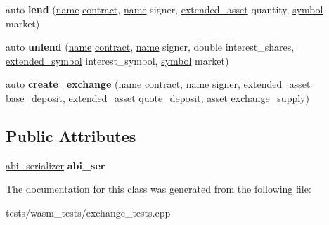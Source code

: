 \begin{DoxyCompactItemize}
\item 
\mbox{\label{classexchange__tester_ab7478daacc99eec074c56476e4bf1ba6}} 
auto {\bfseries lend} (\mbox{\hyperlink{structaacio_1_1name}{name}} \mbox{\hyperlink{structaacio_1_1contract}{contract}}, \mbox{\hyperlink{structaacio_1_1name}{name}} signer, \mbox{\hyperlink{structaacio_1_1extended__asset}{extended\+\_\+asset}} quantity, \mbox{\hyperlink{classaacio_1_1chain_1_1symbol}{symbol}} market)
\item 
\mbox{\label{classexchange__tester_ad70ccccd68e7791f6af3c049ed2dd95b}} 
auto {\bfseries unlend} (\mbox{\hyperlink{structaacio_1_1name}{name}} \mbox{\hyperlink{structaacio_1_1contract}{contract}}, \mbox{\hyperlink{structaacio_1_1name}{name}} signer, double interest\+\_\+shares, \mbox{\hyperlink{structaacio_1_1extended__symbol}{extended\+\_\+symbol}} interest\+\_\+symbol, \mbox{\hyperlink{classaacio_1_1chain_1_1symbol}{symbol}} market)
\item 
\mbox{\label{classexchange__tester_ad4bb96f88cfc3c241841e90a499fa96c}} 
auto {\bfseries create\+\_\+exchange} (\mbox{\hyperlink{structaacio_1_1name}{name}} \mbox{\hyperlink{structaacio_1_1contract}{contract}}, \mbox{\hyperlink{structaacio_1_1name}{name}} signer, \mbox{\hyperlink{structaacio_1_1extended__asset}{extended\+\_\+asset}} base\+\_\+deposit, \mbox{\hyperlink{structaacio_1_1extended__asset}{extended\+\_\+asset}} quote\+\_\+deposit, \mbox{\hyperlink{structaacio_1_1asset}{asset}} exchange\+\_\+supply)
\end{DoxyCompactItemize}
\subsection*{Public Attributes}
\begin{DoxyCompactItemize}
\item 
\mbox{\label{classexchange__tester_aab43e4de1d4b330966d94c31787957a8}} 
\mbox{\hyperlink{structaacio_1_1chain_1_1contracts_1_1abi__serializer}{abi\+\_\+serializer}} {\bfseries abi\+\_\+ser}
\end{DoxyCompactItemize}


The documentation for this class was generated from the following file\+:\begin{DoxyCompactItemize}
\item 
tests/wasm\+\_\+tests/exchange\+\_\+tests.\+cpp\end{DoxyCompactItemize}
